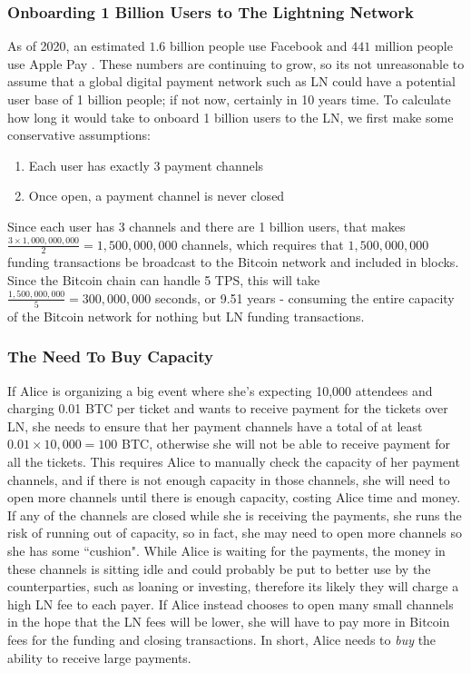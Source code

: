 \documentclass{report}
\begin{document}
	\subsubsection{Onboarding 1 Billion Users to The Lightning Network} 
	As of 2020, an estimated $1.6$ billion people use Facebook \cite{fbusers}  and $441$ million people use Apple Pay \cite{apusers}.  These numbers are continuing to grow, so its not unreasonable to assume that a global digital payment network such as LN could have a potential user base of 1 billion people; if not now, certainly in 10 years time. To calculate how long it would take to onboard 1 billion users to the LN, we first make some conservative assumptions:
	\begin{enumerate}
		\item Each user has exactly 3 payment channels
		\item Once open, a payment channel is never closed
	\end{enumerate}
	Since each user has 3 channels and there are 1 billion users, that makes $\frac{3 \times 1,000,000,000}{2} = 1,500,000,000$ channels, which requires that $1,500,000,000$ funding transactions be broadcast to the Bitcoin network and included in blocks. Since the Bitcoin chain can handle 5 TPS, this will take $\frac{1,500,000,000}{5} = 300,000,000 $ seconds, or 9.51 years - consuming the entire capacity of the Bitcoin network for nothing but LN funding transactions.
	\subsubsection{The Need To Buy Capacity}
	If Alice is organizing a big event where she's expecting 10,000 attendees and charging 0.01 BTC per ticket and wants to receive payment for the tickets over LN, she needs to ensure that her payment channels have a total of at least $0.01 \times 10,000 = 100$ BTC, otherwise she will not be able to receive payment for all the tickets. This requires Alice to manually check the capacity of her payment channels, and if there is not enough capacity  in those channels, she will need to open more channels until there is enough capacity, costing Alice time and money. If any of the channels are closed while she is receiving the payments, she runs the risk of running out of capacity, so in fact, she may need to open more channels so she has some ``cushion". While Alice is waiting for the payments, the money in these channels is sitting idle and could probably be put to better use by the counterparties, such as loaning or investing, therefore its likely they will charge a high LN fee to each payer. If Alice instead chooses to open many small channels in the hope that the LN fees will be lower, she will have to pay more in Bitcoin fees for the funding and closing transactions. In short, Alice needs to \textit{buy} the ability to receive large payments.
\end{document}

